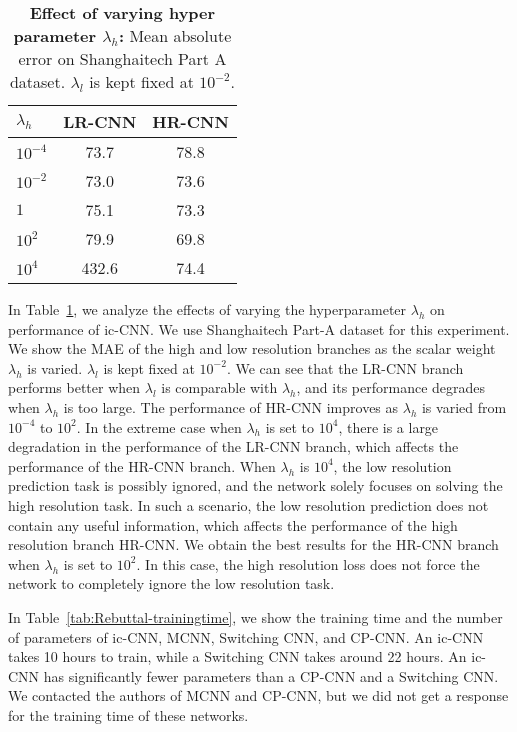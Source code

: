 \documentclass[runningheads]{llncs}
\begin{document}
\setlength{\tabcolsep}{25pt}
\begin{table}[!t]
\centering
\caption{{\bf Effect of varying hyper parameter $\lambda_{h}$:} Mean absolute error on Shanghaitech Part A dataset. $\lambda_{l}$ is kept fixed at $10^{-2}$.
}
\begin{tabular}{lcc}
\toprule
$\lambda_{h}$     & LR-CNN   & HR-CNN   \\
\midrule
$10^{-4}$  & 73.7  & 78.8  \\
$10^{-2}$  & 73.0  & 73.6 \\
$1$   & 75.1  & 73.3 \\
$10^{2}$  & 79.9  &  69.8 \\
$10^{4}$  &  432.6  & 74.4 \\
\bottomrule
\end{tabular}
\label{tab:tableLossWeights}
\end{table}

 In Table~\ref{tab:tableLossWeights}, we analyze the effects of varying the hyperparameter $\lambda_{h}$ on performance of ic-CNN. We use Shanghaitech Part-A dataset for this experiment. We show the MAE of the high and low resolution branches as the scalar weight $\lambda_{h}$ is varied. $\lambda_{l}$ is kept fixed at $10^{-2}$. We can see that the
LR-CNN branch performs better when $\lambda_{l}$ is comparable with $\lambda_{h}$, and its performance degrades when $\lambda_{h}$ is too large. The performance of HR-CNN improves as $\lambda_{h}$ is varied from $10^{-4}$ to $10^2$. In the extreme case when $\lambda_{h}$ is set to $10^{4}$, there is a large degradation in the performance of the LR-CNN branch, which affects the performance of the HR-CNN branch. When $\lambda_{h}$ is $10^{4}$, the low resolution prediction task is possibly ignored, and the network solely focuses on solving the high resolution task. In such a scenario, the low resolution prediction does not contain any useful information, which affects the performance of the high resolution branch HR-CNN. We obtain the best results for the HR-CNN branch
when $\lambda_{h}$ is set to $10^{2}$. In this case, the high resolution loss does not force the network to completely ignore the low resolution task.




In Table~\ref{tab:Rebuttal-trainingtime}, we show the training time and the number of parameters of ic-CNN, MCNN, Switching CNN, and CP-CNN. An ic-CNN takes 10 hours to train, while a Switching CNN takes around 22 hours. An ic-CNN has significantly fewer parameters than a CP-CNN and a Switching CNN. We contacted the authors of MCNN and CP-CNN, but we did not get a response for the training time of these networks.
\end{document}
